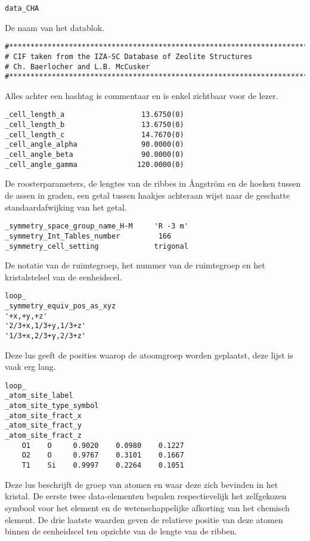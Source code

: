 \begin{lstlisting}
data_CHA
\end{lstlisting}
De naam van het datablok.
\begin{lstlisting}
#**************************************************************************
# CIF taken from the IZA-SC Database of Zeolite Structures
# Ch. Baerlocher and L.B. McCusker
#**************************************************************************
\end{lstlisting}
Alles achter een hashtag is commentaar en is enkel zichtbaar voor de lezer. 
\begin{lstlisting}
_cell_length_a                  13.6750(0)
_cell_length_b                  13.6750(0)
_cell_length_c                  14.7670(0)
_cell_angle_alpha               90.0000(0)
_cell_angle_beta                90.0000(0)
_cell_angle_gamma              120.0000(0)
\end{lstlisting}
De roosterparameters, de lengtes van de ribbes in Ångström en de hoeken tussen de assen in graden, een getal tussen haakjes achteraan wijst naar de geschatte standaardafwijking van het getal. 
\begin{lstlisting}
_symmetry_space_group_name_H-M     'R -3 m'
_symmetry_Int_Tables_number         166
_symmetry_cell_setting             trigonal
\end{lstlisting}
De notatie van de ruimtegroep, het nummer van de ruimtegroep en het kristalstelsel van de eenheidscel.
\begin{lstlisting}
loop_
_symmetry_equiv_pos_as_xyz
'+x,+y,+z'
'2/3+x,1/3+y,1/3+z'
'1/3+x,2/3+y,2/3+z'
\end{lstlisting}
Deze lus geeft de posities waarop de atoomgroep worden geplaatst, deze lijst is vaak erg lang.
\begin{lstlisting}
loop_
_atom_site_label
_atom_site_type_symbol
_atom_site_fract_x
_atom_site_fract_y
_atom_site_fract_z
    O1    O     0.9020    0.0980    0.1227
    O2    O     0.9767    0.3101    0.1667
    T1    Si    0.9997    0.2264    0.1051
\end{lstlisting}
Deze lus beschrijft de groep van atomen en waar deze zich bevinden in het kristal. De eerste twee data-elementen bepalen respectievelijk het zelfgekozen symbool voor het element en de wetenschappelijke afkorting van het chemisch element. De drie laatste waarden geven de relatieve positie van deze atomen binnen de eenheidscel ten opzichte van de lengte van de ribben.

